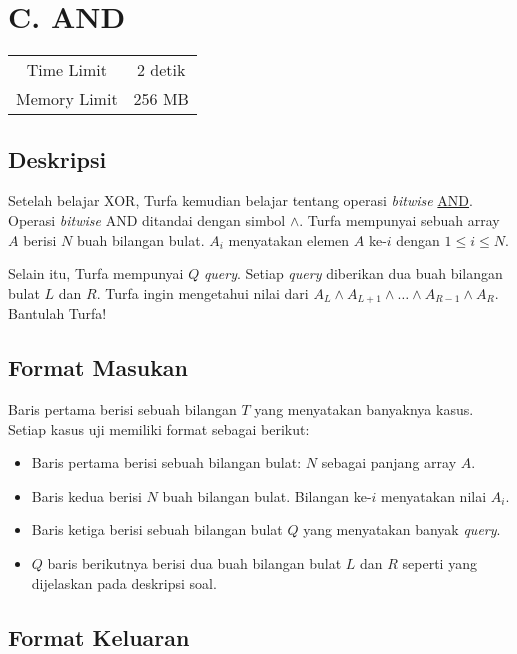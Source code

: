 \documentclass{article}
\begin{document}
\section*{\hfil C. AND\hfil}

\begin{center}
\begin{tabular}{ |cc| } 
 \hline
 Time Limit & 2 detik \\ 
 Memory Limit & 256 MB \\
 \hline
\end{tabular}
\end{center}

\subsection*{Deskripsi}
\par Setelah belajar XOR, Turfa kemudian belajar tentang operasi \textit{bitwise} \href{https://en.wikipedia.org/wiki/Bitwise_operation#AND}{AND}. Operasi \textit{bitwise} AND ditandai dengan simbol $\land$. Turfa mempunyai sebuah array $A$ berisi $N$ buah bilangan bulat. $A_{i}$ menyatakan elemen $A$ ke-$i$ dengan $1 \leq i \leq N$.
\par Selain itu, Turfa mempunyai $Q$ \textit{query}. Setiap \textit{query} diberikan dua buah bilangan bulat $L$ dan $R$. Turfa ingin mengetahui nilai dari $A_{L} \land A_{L+1} \land \dots \land A_{R-1} \land A_{R}$. Bantulah Turfa!

\subsection*{Format Masukan}
\par Baris pertama berisi sebuah bilangan $T$ yang menyatakan banyaknya kasus. Setiap kasus uji memiliki format sebagai berikut:
\begin{itemize}
\item Baris pertama berisi sebuah bilangan bulat: $N$ sebagai panjang array $A$.
\item Baris kedua berisi $N$ buah bilangan bulat. Bilangan ke-$i$ menyatakan nilai $A_{i}$.
\item Baris ketiga berisi sebuah bilangan bulat $Q$ yang menyatakan banyak \textit{query}.
\item $Q$ baris berikutnya berisi dua buah bilangan bulat $L$ dan $R$ seperti yang dijelaskan pada deskripsi soal.
\end{itemize}

\subsection*{Format Keluaran}
\end{document}

